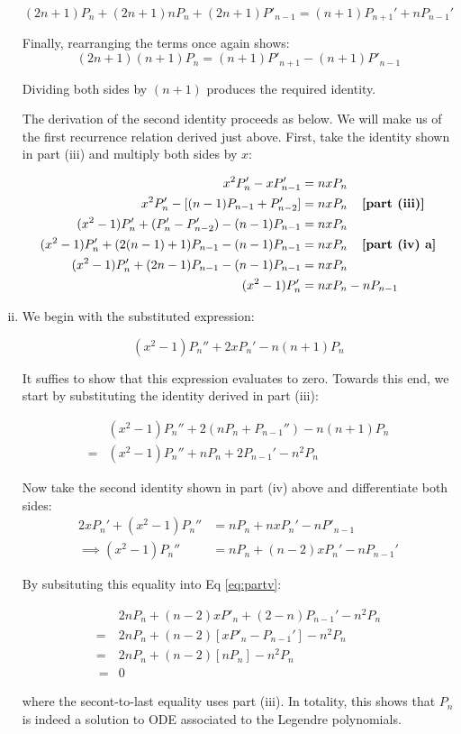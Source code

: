 \documentclass[12pt]{article}%
\begin{document}
\begin{enumerate}[i.]
    \[ (2n+1)P_n + (2n+1)nP_n + (2n+1) P'_{n-1} = (n+1)P_{n+1}' + nP_{n-1}'\]

    Finally, rearranging the terms once again shows:
    \[ (2n+1)(n+1)P_n = (n+1)P'_{n+1} - (n+1)P'_{n-1}  \]

    Dividing both sides by $(n+1)$ produces the required identity.

  The derivation of the second identity proceeds as below. We will make us of the first recurrence relation derived just above. First, take the identity shown in part (iii) and multiply both sides by $x$:

  \begin{align*}
      x^2P_n' - xP_{n-1}' & = nxP_n \\
      x^2P_n' - [(n-1)P_{n-1} + P_{n-2}'] & = nxP_n \textbf{\quad [part (iii)] } \\
      (x^2-1)P_n' + (P'_n - P_{n-2}') - (n-1)P_{n-1} & = nxP_n  \\
      (x^2-1)P_n' + (2(n-1)+1)P_{n-1} - (n-1)P_{n-1} & = nxP_n \textbf{\quad [part (iv) a]} \\
      (x^2-1)P_n' + (2n -1)P_{n-1}  - (n-1)P_{n-1} & = nxP_n \\
      (x^2-1)P_n' & = nxP_n - nP_{n-1}
  \end{align*}



\item
We begin with the substituted expression:

\begin{equation}
  (x^2 -1)P_n'' + 2xP_n' - n(n+1)P_n
\end{equation}

It suffies to show that this expression evaluates to zero. Towards this end, we start by substituting the identity derived in part (iii):

\begin{align}
  & (x^2 -1)P_n'' + 2(nP_n + P_{n-1}'') - n(n+1)P_n \\
= & (x^2 -1)P_n'' + nP_n + 2P_{n-1}' - n^2 P_n \label{eq:partv}
\end{align}

Now take the second identity shown in part (iv) above and differentiate both sides:
\begin{align*}
  2xP_n' + (x^2 - 1)P_n'' & = nP_n + nxP_n' - nP'_{n-1} \\
  \implies (x^2 - 1)P_n'' & = nP_n + (n-2)xP_n' - nP_{n-1}'
\end{align*}

By subsituting this equality into Eq \ref{eq:partv}:

\begin{align*}
  & 2nP_n + (n-2)xP'_n + (2-n)P_{n-1}' - n^2P_n \\
  = & 2nP_n + (n-2)[xP'_n - P_{n-1}'] - n^2 P_n \\
  = & 2nP_n + (n-2)[nP_n] - n^2P_n \\\
  = & 0
\end{align*}

where the secont-to-last equality uses part (iii).
In totality, this shows that $P_n$ is indeed a solution to ODE associated to the Legendre polynomials.
\end{enumerate}
\end{document}

